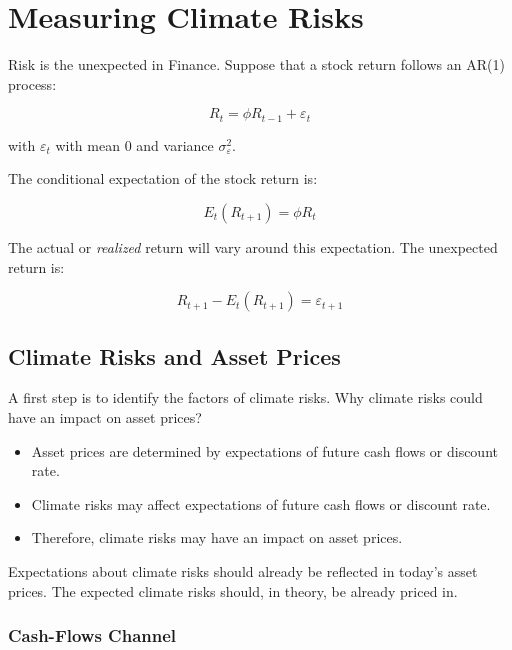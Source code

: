 \chapter{Measuring Climate Risks}

Risk is the unexpected in Finance.
Suppose that a stock return follows an AR(1) process:

\begin{equation}
    R_{t} = \phi R_ {t-1} + \varepsilon_{t}
\end{equation}

with $\varepsilon_{t}$ with mean 0 and variance $\sigma_{\varepsilon}^2$.

The conditional expectation of the stock return is:

\begin{equation}
    E_t(R_{t+1}) = \phi R_t
\end{equation}

The actual or \textit{realized} return will vary 
around this expectation. The unexpected return is:

\begin{equation}
    R_{t+1} - E_t(R_{t+1}) = \varepsilon_{t+1}
\end{equation}



\section{Climate Risks and Asset Prices}


A first step is to identify the factors of climate risks.
Why climate risks could have an impact on asset prices?

\begin{itemize}
    \item Asset prices are determined by
    expectations of future cash flows or discount rate.
    \item Climate risks may 
    affect expectations of future cash flows or discount rate.
    \item Therefore, climate risks may have an impact on asset prices.
\end{itemize}

Expectations about climate risks should 
already be reflected in today's asset prices.
The expected climate risks should, 
in theory, be already priced in.

\subsection{Cash-Flows Channel}

